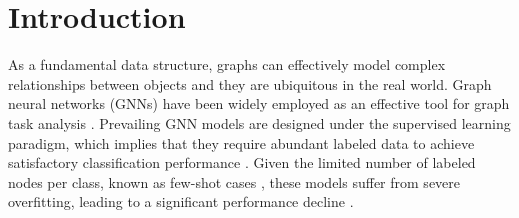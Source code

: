 \section{Introduction}
As a fundamental data structure, graphs can effectively model complex relationships between objects and they are ubiquitous in the real world. %
Graph neural networks (GNNs) %
have been widely employed as an effective tool for graph %
task analysis \cite{kipf2016semi, liu2021vplag, liu2021deep, liu2023time, liulocal, li2024simple, liu2024simple, liu2024improved, liu2024resolving, liu2025boosting, liu2025improved, liu2025enhancing}. Prevailing GNN models are designed under the supervised learning paradigm, which implies that they require abundant labeled data to achieve satisfactory classification performance \cite{ding2020graph, tan2022transductive}. Given the limited number of labeled nodes per class, known as few-shot cases \cite{zhang2022few, liu2022few}, 
these models suffer from severe overfitting, leading to a significant performance decline \cite{liu2019learning, huang2020graph}. %


